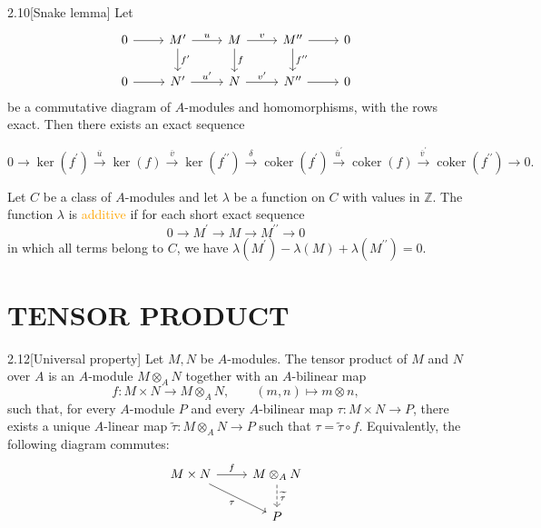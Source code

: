 \begin{proposition}{2.10}[Snake lemma]
	Let
	\begin{equation*}
		\begin{tikzcd}
		0\arrow[r]&M^\prime\arrow[r,"u"]\arrow[d,"f^\prime"]&M\arrow[r,"v"]\arrow[d,"f"]
			&M^{\prime\prime}\arrow[r]\arrow[d,"f^{\prime\prime}"]&0\\
		0\arrow[r]&N^\prime\arrow[r,"u^\prime"]&N\arrow[r,"v^\prime"]
			&N^{\prime\prime}\arrow[r]&0
	\end{tikzcd}
	\end{equation*}
	be a commutative diagram of $A$-modules and homomorphisms, with the rows exact. Then there exists an exact sequence

	\begin{equation*}
		0\longrightarrow\ker\left(f^\prime\right)\xrightarrow{\;\overline{u}\;}\ker(f)\xrightarrow{\;\overline{v}\;}\ker\left(f^{\prime\prime}\right)\xrightarrow{\;\delta\;}
		\operatorname{coker}\left(f^\prime\right)\xrightarrow{\;\overline{u}^\prime\;}\operatorname{coker}(f)\xrightarrow{\;\overline{v}^\prime\;}\operatorname{coker}\left(f^{\prime\prime}\right)\longrightarrow0.
	\end{equation*}

\end{proposition}

\begin{definition}
	Let $C$ be a class of $A$-modules and let $\lambda$ be a function on $C$ with values in $\mathbb{Z}$. The function $\lambda$ is \textcolor{orange}{additive} if for each short exact sequence
	\begin{equation*}
		0\rightarrow M^\prime\rightarrow M\rightarrow M^{\prime\prime}\rightarrow0
	\end{equation*}
	in which all terms belong to $C$, we have $\lambda(M^\prime)-\lambda(M)+\lambda(M^{\prime\prime})=0$.
\end{definition}

\section*{TENSOR PRODUCT}

\begin{proposition}{2.12}[Universal property]
	Let $M,N$ be $A$-modules. The tensor product of $M$ and $N$ over $A$ is an $A$-module $M\otimes_AN$	together with an $A$-bilinear map
	\begin{equation*}
		f:M\times N\to M\otimes_A N,\qquad (m,n)\mapsto m\otimes n,
	\end{equation*}
	such that, for every $A$-module $P$ and every $A$-bilinear map $\tau:M\times N\to P$, there exists a unique $A$-linear map $\widetilde{\tau}:M\otimes_AN\to P$ such that $\tau=\widetilde{\tau}\circ f$. Equivalently, the following diagram commutes:
	\begin{equation*}
		\begin{tikzcd}
			M\times N \arrow[r,"f"] \arrow[dr,"\tau"'] &
			M\otimes_A N \arrow[d,dashed,"\widetilde{\tau}"] \\
			& P
		\end{tikzcd}
	\end{equation*}	
\end{proposition}

